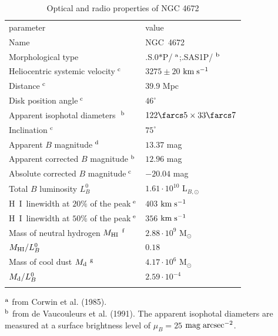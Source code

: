 \documentclass[twocolumns]{aa}
\def\kms{$\rm km\;s^{-1}$}
\def\dg{^\circ}
\def\hi{H~{\scriptsize I}}
\def\msun{M$_{\odot}$}
\def\lbsun{L$_{B,\odot}$}
\begin{document}
\begin{table}[ht]
\caption{Optical and radio properties of NGC 4672}
\begin{center}
\begin{tabular}{ll}
\hline
\noalign{\smallskip} 
parameter & value \\
\noalign{\smallskip} 
\hline
\noalign{\smallskip} 
Name                                            &  NGC~4672 \\
Morphological type           & .S.0$\ast$P/$\;^{\rm a}$;.SAS1P/$\;^{\rm b}$\\ 
Heliocentric systemic velocity$\;^{\rm c}$      & $3275\pm20$ \kms\\
Distance$\;^{\rm c}$                            & 39.9 Mpc\\
Disk position angle$\;^{\rm c}$                 & $46\dg$ \\
Apparent isophotal diameters $\;^{\rm b}$    & $122\farcs5\times33\farcs7$ \\ 
Inclination$\;^{\rm c}$                         & $75\dg$  \\
Apparent $B$ magnitude$\;^{\rm d}$              & $13.37$ mag \\
Apparent corrected $B$ magnitude$\;^{\rm b}$    & $12.96$ mag \\
Absolute corrected $B$ magnitude$\;^{\rm c}$    & $-20.04$ mag \\
Total $B$ luminosity $L_B^0$                    & $1.61\cdot10^{10}$ \lbsun \\
\hi\ linewidth at $20\%$ of the peak$\;^{\rm e}$& $403$ \kms \\
\hi\ linewidth at $50\%$ of the peak$\;^{\rm e}$& $356$ \kms \\
Mass of neutral hydrogen $M_{\rm HI}$$\;^{\rm f}$ & $2.88\cdot10^9$ \msun \\
$M_{\rm HI}/L_B^0$                                & $0.18$ \\
Mass of cool dust $M_{\rm d}$$\;^{\rm g}$       & $4.17\cdot10^6$ \msun \\
$M_{\rm d}/L_B^0$                                 & $2.59\cdot10^{-4}$ \\
\noalign{\smallskip} 
\hline
\noalign{\smallskip} 
\noalign{\smallskip} 
\noalign{\smallskip} 
\end{tabular}
\begin{minipage}{8cm}
$^{\rm a}$ from Corwin et al. (1985).\\
$^{\rm b}$ from de Vaucouleurs et al. (1991).  
The apparent isophotal diameters are measured at
a surface brightness level of $\mu_B = 25$ $\rm mag\;arcsec^{-2}$.\\ 

\end{minipage}
\end{center}
\end{table}
\end{document}

